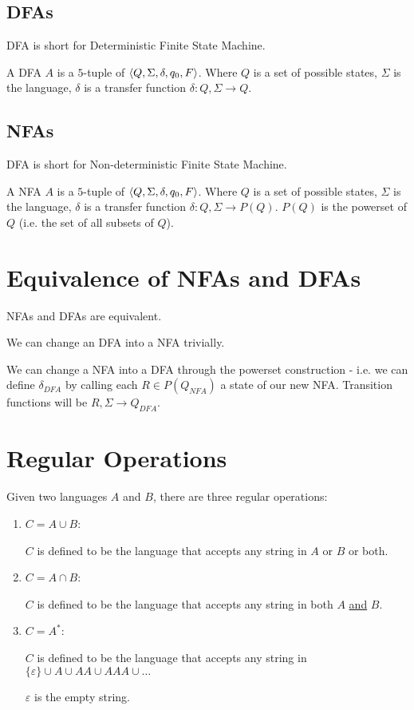         \subsection{DFAs} %
            DFA is short for Deterministic Finite State Machine.

            A DFA $A$ is a $5$-tuple of $\left \langle Q, \Sigma, \delta, q_0, F \right \rangle $.
            Where $Q$ is a set of possible states, $\Sigma$ is the language,
            $\delta$ is a transfer function $\delta: Q, \Sigma \to Q$.
        \subsection{NFAs} %
            DFA is short for Non-deterministic Finite State Machine.

            A NFA $A$ is a $5$-tuple of $\left \langle Q, \Sigma, \delta, q_0, F \right \rangle $.
            Where $Q$ is a set of possible states, $\Sigma$ is the language,
            $\delta$ is a transfer function $\delta: Q, \Sigma \to P(Q)$. $P(Q)$
            is the powerset of $Q$ (i.e. the set of all subsets of $Q$).

    \section{Equivalence of NFAs and DFAs}
        NFAs and DFAs are equivalent.

        We can change an DFA into a NFA trivially.

        We can change a NFA into a DFA through the powerset construction - i.e.
        we can define $\delta_{DFA}$ by calling each $R \in P(Q_{NFA})$ a state
        of our new NFA. Transition functions will be $R, \Sigma \to Q_{DFA}$.

    \section{Regular Operations}
        Given two languages $A$ and $B$, there are three regular operations:
        \begin{enumerate}
            \item $C = A \cup B$:

                $C$ is defined to be the language that accepts any string in $A$
                or $B$ or both.

            \item $C = A \cap B$:

                $C$ is defined to be the language that accepts any string in
                both $A$ \uline{and} $B$.

            \item $C = A^*$:

                $C$ is defined to be the language that accepts any string in
                $\{ \varepsilon \} \cup A \cup AA \cup AAA \cup \ldots$

                $\varepsilon$ is the empty string.
        \end{enumerate}
